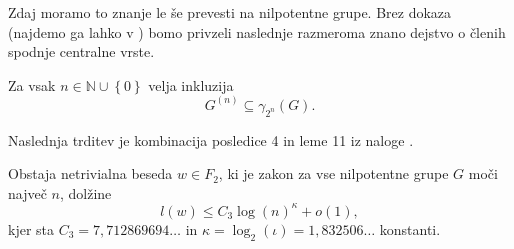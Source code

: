 Zdaj moramo to znanje le še prevesti na nilpotentne grupe. Brez dokaza (najdemo ga lahko v \cite[str.~17--18]{Schneider}) bomo privzeli naslednje razmeroma znano dejstvo o členih
spodnje centralne vrste. 

\begin{lema}
\label{lem_povezava_med_spodnjo_in_izpeljano_vrsto}
Za vsak $n \in \mathbb{N} \cup \left\{ 0\right\} $ velja inkluzija
\begin{equation*}
G^{(n)} \subseteq \gamma_{2^{n}}(G).
\end{equation*}    
\end{lema}

Naslednja trditev je kombinacija posledice 4 in leme 11 iz naloge \cite{Schneider_2016}.

\begin{trditev}
\label{trd_koncna_ugotovitev_nilpotentne_v_nalogi}
 Obstaja netrivialna beseda $w \in F_2$, ki je zakon za vse nilpotentne grupe $G$ moči največ $n$, dolžine \begin{equation*}
 l(w) \le  C_3 \log(n)^{\kappa} + o(1),
 \end{equation*}  
 kjer sta $C_3 = 7{,}712869694 \ldots$ in $\kappa = \log_2(\iota) = 1{,}832506 \ldots$ konstanti.    
\end{trditev}

